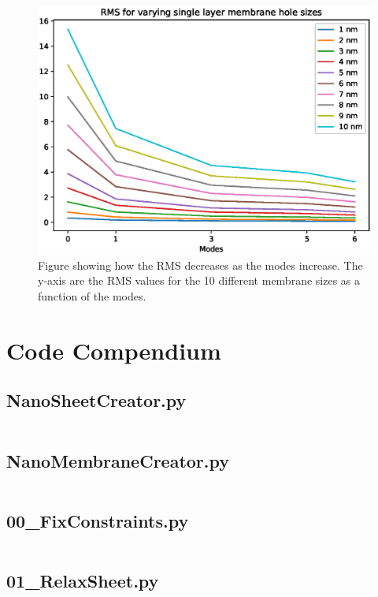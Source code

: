 \begin{figure}
    \centering
    \includegraphics{Figures/RMSvsSize.eps}
    \caption{Figure showing how the RMS decreases as the modes increase. The y-axis are the RMS values for the 10 different membrane sizes as a function of the modes.}
    \label{plot1}
\end{figure}

\section{Code Compendium}\label{CoCo}
\subsection{NanoSheetCreator.py}
\inputminted[python3=true,bgcolor=Black,linenos=true]{python}{VNL/PythonScripts/Scripts/NanoSheetCreator.py}
\subsection{NanoMembraneCreator.py}
\inputminted[python3=true,bgcolor=Black,linenos=true]{python}{VNL/PythonScripts/Scripts/NanoMembraneCreator.py}
\subsection{00\_FixConstraints.py}
\inputminted[python3=true,bgcolor=Black,linenos=true]{python}{VNL/PythonScripts/Scripts/00_FixConstraints.py}
\subsection{01\_RelaxSheet.py}
\inputminted[python3=true,bgcolor=Black,linenos=true]{python}{VNL/PythonScripts/Scripts/01_RelaxSheet.py}
